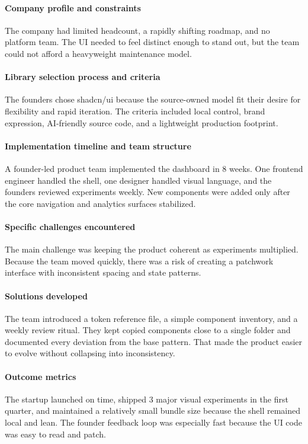 \paragraph{Company profile and constraints}
The company had limited headcount, a rapidly shifting roadmap, and no platform team. The UI needed to feel distinct enough to stand out, but the team could not afford a heavyweight maintenance model.

\paragraph{Library selection process and criteria}
The founders chose shadcn/ui because the source-owned model fit their desire for flexibility and rapid iteration. The criteria included local control, brand expression, AI-friendly source code, and a lightweight production footprint.

\paragraph{Implementation timeline and team structure}
A founder-led product team implemented the dashboard in 8 weeks. One frontend engineer handled the shell, one designer handled visual language, and the founders reviewed experiments weekly. New components were added only after the core navigation and analytics surfaces stabilized.

\paragraph{Specific challenges encountered}
The main challenge was keeping the product coherent as experiments multiplied. Because the team moved quickly, there was a risk of creating a patchwork interface with inconsistent spacing and state patterns.

\paragraph{Solutions developed}
The team introduced a token reference file, a simple component inventory, and a weekly review ritual. They kept copied components close to a single folder and documented every deviation from the base pattern. That made the product easier to evolve without collapsing into inconsistency.

\paragraph{Outcome metrics}
The startup launched on time, shipped 3 major visual experiments in the first quarter, and maintained a relatively small bundle size because the shell remained local and lean. The founder feedback loop was especially fast because the UI code was easy to read and patch.

